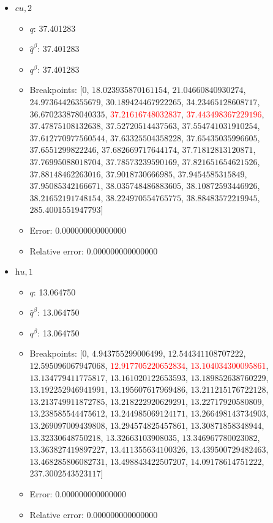 \documentclass{article}%
\begin{document}
\begin{itemize}
\begin{itemize}
	\end{itemize}%
	\item $\textit{cu},2$%
	\begin{itemize}%
		\item $q$: 37.401283%
		\item $\hat{q}^\beta$: 37.401283%
		\item $q^\beta$: 37.401283%
		\item Breakpoints: $[$$0$, $18.023935870161154$, $21.04660840930274$, $24.97364426355679$, $30.189424467922265$, $34.23465128608717$, $36.670233878040335$, \textcolor{red}{$37.21616748032837$}, \textcolor{red}{$37.443498367229196$}, $37.47875108132638$, $37.52720514437563$, $37.554741031910254$, $37.612770977560544$, $37.63325504358228$, $37.65435035996605$, $37.6551299822246$, $37.682669717644174$, $37.71812813120871$, $37.76995088018704$, $37.78573239590169$, $37.821651654621526$, $37.88148462263016$, $37.9018730666985$, $37.9454585315849$, $37.95085342166671$, $38.035748486883605$, $38.10872593446926$, $38.21652191748154$, $38.224970554765775$, $38.88483572219945$, $285.4001551947793$$]$%
		\item Error: 0.000000000000000%
		\item Relative error: 0.000000000000000%
	\end{itemize}%
	\item $\textit{hu},1$%
	\begin{itemize}%
		\item $q$: 13.064750%
		\item $\hat{q}^\beta$: 13.064750%
		\item $q^\beta$: 13.064750%
		\item Breakpoints: $[$$0$, $4.943755299006499$, $12.544341108707222$, $12.595096067947068$, \textcolor{red}{$12.917705220652834$}, \textcolor{red}{$13.104034300095861$}, $13.134779411775817$, $13.161020122653593$, $13.189852638760229$, $13.192252946941991$, $13.195607617969486$, $13.211215176722128$, $13.213749911872785$, $13.218222920629291$, $13.22717920580809$, $13.238585544475612$, $13.244985069124171$, $13.266498143734903$, $13.269097009439808$, $13.294574825457861$, $13.30871858348944$, $13.32330648750218$, $13.32663103908035$, $13.346967780023082$, $13.363827419897227$, $13.411355634100326$, $13.439500729482463$, $13.468285806082731$, $13.498843422507207$, $14.09178614751222$, $237.3002543523117$$]$%
		\item Error: 0.000000000000000%
		\item Relative error: 0.000000000000000%
	\end{itemize}%
\end{itemize}%
\end{document}
